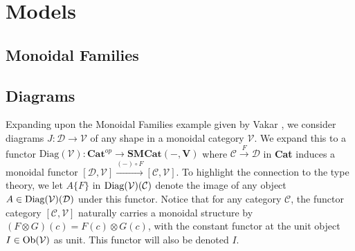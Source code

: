 \section{Models}
\subsection{Monoidal Families}
\subsection{Diagrams}
Expanding upon the Monoidal Families example given by Vakar \cite{vakar14}, we consider diagrams $J : \mathcal{D} \to \mathcal{V}$ of any shape in a monoidal category $\mathcal{V}$. We expand this to a functor $\text{Diag}(\mathcal{V}) : \mathbf{Cat}^{op} \to \mathbf{SMCat(-,V)}$ where $\mathcal{C} \xrightarrow{F} \mathcal{D}$ in \textbf{Cat} induces a monoidal functor $[\mathcal{D}, \mathcal{V}] \xrightarrow{(-) \circ F} [\mathcal{C}, \mathcal{V}]$. To highlight the connection to the type theory, we let $A\{F\}$ in  $\operatorname{\text{Diag}}(\mathcal{V})(\mathcal{C})$ denote the image of any object $A \in \operatorname{\text{Diag}}(\mathcal{V})(\mathcal{D})$ under this functor. Notice that for any category $\mathcal{C}$, the functor category $[\mathcal{C}, \mathcal{V}]$ naturally carries a monoidal structure by $(F \otimes G)(c) = F(c) \otimes G(c)$, with the constant functor at the unit object $I \in \mathcal{\operatorname{\text{Ob}}(V)}$ as unit. This functor will also be denoted $I$.
